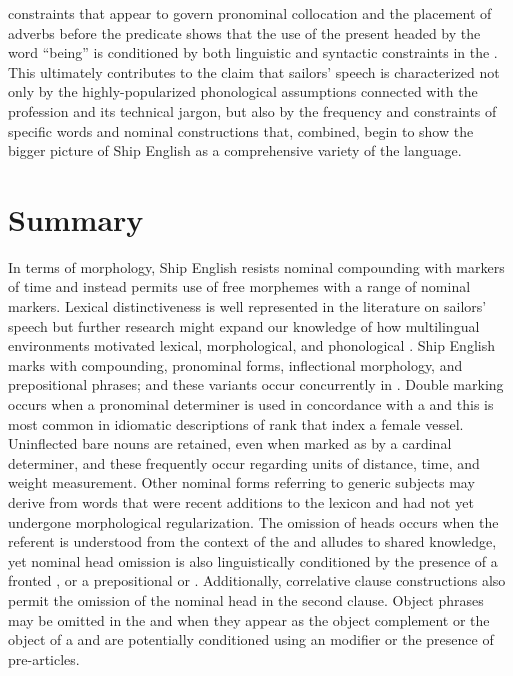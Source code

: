 constraints that appear to govern  pronominal collocation and the placement of adverbs before the predicate shows that the use of the present  headed by the word “being” is conditioned by both linguistic and syntactic constraints in the . This ultimately contributes to the claim that sailors’ speech is characterized not only by the highly-popularized phonological assumptions connected with the profession and its technical jargon, but also by the frequency and constraints of specific words and nominal constructions that, combined, begin to show the bigger picture of Ship English as a comprehensive variety of the language.  

\section{{Summary} }\label{sec:5.6}

In terms of morphology, Ship English resists nominal compounding with markers of time and instead permits use of free morphemes with a range of nominal markers. Lexical distinctiveness is well represented in the literature on sailors’ speech but further research might expand our knowledge of how multilingual environments motivated lexical, morphological, and phonological . Ship English marks  with  compounding,  pronominal forms, inflectional morphology, and prepositional phrases; and these variants occur concurrently in . Double  marking occurs when a pronominal  determiner is used in concordance with a  and this is most common in idiomatic descriptions of rank that index a female vessel. Uninflected bare nouns are retained, even when marked as  by a cardinal determiner, and these frequently occur regarding units of distance, time, and weight measurement. Other  nominal forms referring to generic subjects may derive from words that were recent additions to the lexicon and had not yet undergone morphological regularization. The omission of  heads occurs when the referent is understood from the context of the  and alludes to shared knowledge, yet nominal head omission is also linguistically conditioned by the presence of a fronted , or a prepositional or . Additionally, correlative clause constructions also permit the omission of the nominal head in the second clause. Object  phrases may be omitted in the  and when they appear as the object complement or the object of a  and are potentially conditioned using an  modifier or the presence of pre-articles.

